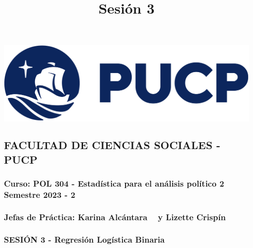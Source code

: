 \documentclass[
]{article}
\title{Sesión 3}
\author{}
\date{\vspace{-2.5em}}
\begin{document}
\maketitle

{
\setcounter{tocdepth}{1}
\tableofcontents
}
\begin{flushleft}\includegraphics[width=0.3\linewidth]{logoPUCP} \end{flushleft}

\hypertarget{facultad-de-ciencias-sociales---pucp}{%
\subsection{\texorpdfstring{FACULTAD DE CIENCIAS SOCIALES - PUCP
}{FACULTAD DE CIENCIAS SOCIALES - PUCP  }}\label{facultad-de-ciencias-sociales---pucp}}

\hypertarget{curso-pol-304---estaduxedstica-para-el-anuxe1lisis-poluxedtico-2-semestre-2023---2}{%
\subsubsection{\texorpdfstring{Curso: POL 304 - Estadística para el
análisis político 2 \textbar{} Semestre 2023 - 2
}{Curso: POL 304 - Estadística para el análisis político 2 \textbar{} Semestre 2023 - 2  }}\label{curso-pol-304---estaduxedstica-para-el-anuxe1lisis-poluxedtico-2-semestre-2023---2}}

\hypertarget{jefas-de-pruxe1ctica-karina-alcuxe1ntara-y-lizette-crispuxedn}{%
\subsubsection{\texorpdfstring{Jefas de Práctica: Karina Alcántara 👩‍🏫 y
Lizette Crispín
👩‍🏫}{Jefas de Práctica: Karina Alcántara 👩‍🏫 y Lizette Crispín 👩‍🏫 }}\label{jefas-de-pruxe1ctica-karina-alcuxe1ntara-y-lizette-crispuxedn}}

\hypertarget{sesiuxf3n-3---regresiuxf3n-loguxedstica-binaria}{%
\subsubsection{\texorpdfstring{\textbf{SESIÓN 3 - Regresión Logística
Binaria}
}{SESIÓN 3 - Regresión Logística Binaria  }}\label{sesiuxf3n-3---regresiuxf3n-loguxedstica-binaria}}
\end{document}
